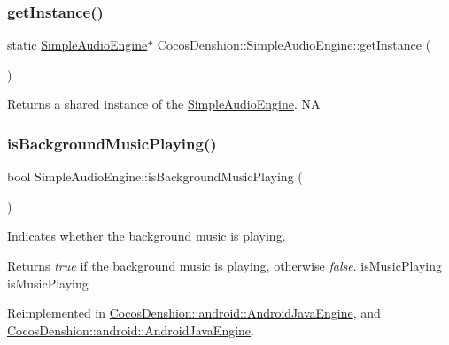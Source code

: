 \subsubsection{\texorpdfstring{get\+Instance()}{getInstance()}\hspace{0.1cm}{\footnotesize\ttfamily [2/2]}}
{\footnotesize\ttfamily static \hyperlink{classCocosDenshion_1_1SimpleAudioEngine}{Simple\+Audio\+Engine}$\ast$ Cocos\+Denshion\+::\+Simple\+Audio\+Engine\+::get\+Instance (\begin{DoxyParamCaption}{ }\end{DoxyParamCaption})\hspace{0.3cm}{\ttfamily [static]}}

Returns a shared instance of the \hyperlink{classCocosDenshion_1_1SimpleAudioEngine}{Simple\+Audio\+Engine}.  NA \mbox{\label{classCocosDenshion_1_1SimpleAudioEngine_a657a39bd7259565a4571699c3e6d56fd}} 
\subsubsection{\texorpdfstring{is\+Background\+Music\+Playing()}{isBackgroundMusicPlaying()}\hspace{0.1cm}{\footnotesize\ttfamily [1/2]}}
{\footnotesize\ttfamily bool Simple\+Audio\+Engine\+::is\+Background\+Music\+Playing (\begin{DoxyParamCaption}{ }\end{DoxyParamCaption})\hspace{0.3cm}{\ttfamily [virtual]}}

Indicates whether the background music is playing.

\begin{DoxyReturn}{Returns}
{\itshape true} if the background music is playing, otherwise {\itshape false}.  is\+Music\+Playing  is\+Music\+Playing 
\end{DoxyReturn}


Reimplemented in \hyperlink{classCocosDenshion_1_1android_1_1AndroidJavaEngine_ac709dfafca7cee544b93cf91c0cf3d2d}{Cocos\+Denshion\+::android\+::\+Android\+Java\+Engine}, and \hyperlink{classCocosDenshion_1_1android_1_1AndroidJavaEngine_a2bfbe26dae6b6a8a18fcd3e6e97f0c7e}{Cocos\+Denshion\+::android\+::\+Android\+Java\+Engine}.

